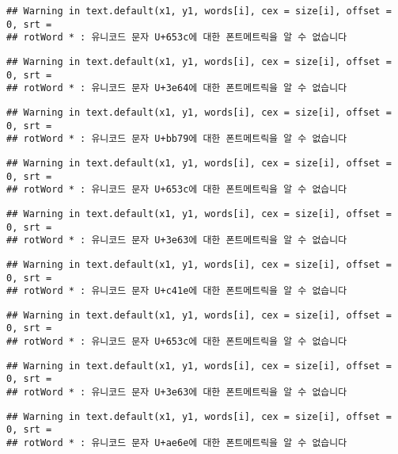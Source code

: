 \documentclass[]{article}
\begin{document}
\begin{verbatim}
## Warning in text.default(x1, y1, words[i], cex = size[i], offset = 0, srt =
## rotWord * : 유니코드 문자 U+653c에 대한 폰트메트릭을 알 수 없습니다
\end{verbatim}

\begin{verbatim}
## Warning in text.default(x1, y1, words[i], cex = size[i], offset = 0, srt =
## rotWord * : 유니코드 문자 U+3e64에 대한 폰트메트릭을 알 수 없습니다
\end{verbatim}

\begin{verbatim}
## Warning in text.default(x1, y1, words[i], cex = size[i], offset = 0, srt =
## rotWord * : 유니코드 문자 U+bb79에 대한 폰트메트릭을 알 수 없습니다
\end{verbatim}

\begin{verbatim}
## Warning in text.default(x1, y1, words[i], cex = size[i], offset = 0, srt =
## rotWord * : 유니코드 문자 U+653c에 대한 폰트메트릭을 알 수 없습니다
\end{verbatim}

\begin{verbatim}
## Warning in text.default(x1, y1, words[i], cex = size[i], offset = 0, srt =
## rotWord * : 유니코드 문자 U+3e63에 대한 폰트메트릭을 알 수 없습니다
\end{verbatim}

\begin{verbatim}
## Warning in text.default(x1, y1, words[i], cex = size[i], offset = 0, srt =
## rotWord * : 유니코드 문자 U+c41e에 대한 폰트메트릭을 알 수 없습니다
\end{verbatim}

\begin{verbatim}
## Warning in text.default(x1, y1, words[i], cex = size[i], offset = 0, srt =
## rotWord * : 유니코드 문자 U+653c에 대한 폰트메트릭을 알 수 없습니다
\end{verbatim}

\begin{verbatim}
## Warning in text.default(x1, y1, words[i], cex = size[i], offset = 0, srt =
## rotWord * : 유니코드 문자 U+3e63에 대한 폰트메트릭을 알 수 없습니다
\end{verbatim}

\begin{verbatim}
## Warning in text.default(x1, y1, words[i], cex = size[i], offset = 0, srt =
## rotWord * : 유니코드 문자 U+ae6e에 대한 폰트메트릭을 알 수 없습니다
\end{verbatim}
\end{document}
